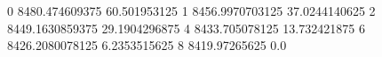 0 8480.474609375 60.501953125
1 8456.9970703125 37.0244140625
2 8449.1630859375 29.1904296875
4 8433.705078125 13.732421875
6 8426.2080078125 6.2353515625
8 8419.97265625 0.0
